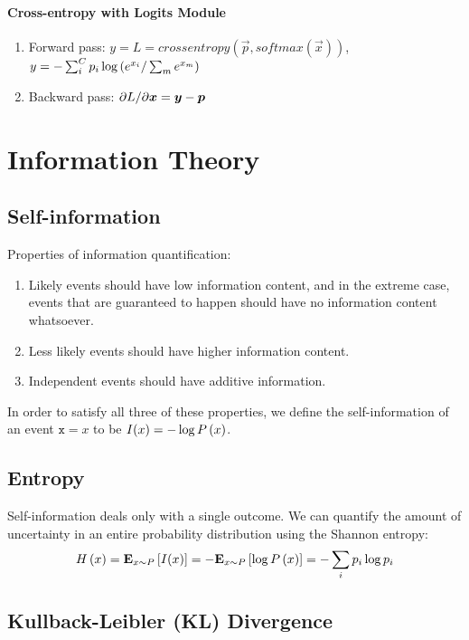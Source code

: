 \paragraph{Cross-entropy with Logits Module}

\begin{enumerate}
	\item Forward pass: $y=L=crossentropy(\vec{p},softmax(\vec{x}))$, $y=-\sum_i^Cp_i\log\ppfrac{e^{x_i}}{\sum_m e^{x_m}}$
	\item Backward pass: $\pfrac{\pa L}{\pa\vec{x}}=\vec{y}-\vec{p}$
\end{enumerate}




\section{Information Theory}
\label{section2.4}

\subsection{Self-information}

Properties of information quantification:
\begin{enumerate}
	\item Likely events should have low information content, and in the extreme case, events that are guaranteed to happen should have no information content whatsoever.
	\item Less likely events should have higher information content.
	\item Independent events should have additive information.
\end{enumerate}
In order to satisfy all three of these properties, we define the self-information of an event $\mathtt{x}=x$ to be $I(x)=-\log\P{x}$.

\subsection{Entropy}
Self-information deals only with a single outcome. We can quantify the amount of uncertainty in an entire probability distribution using the Shannon entropy:
\begin{align*}
	\H{x}=\Ep{x\sim P}{I(x)}=-\Ep{x\sim P}{\log\P{x}}=-\sum_i p_i\log p_i
\end{align*}

\subsection{Kullback-Leibler (KL) Divergence}

